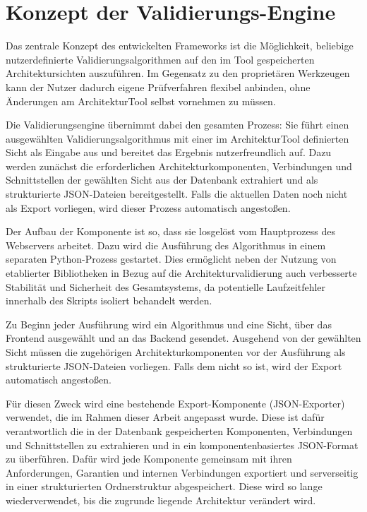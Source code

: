 \section{Konzept der Validierungs-Engine}
\label{sect:K_engine}
Das zentrale Konzept des entwickelten Frameworks ist die Möglichkeit, beliebige nutzerdefinierte Validierungsalgorithmen auf den im Tool gespeicherten Architektursichten auszuführen. Im Gegensatz zu den proprietären Werkzeugen kann der Nutzer dadurch eigene Prüfverfahren flexibel anbinden, ohne Änderungen am ArchitekturTool selbst vornehmen zu müssen.

Die Validierungsengine übernimmt dabei den gesamten Prozess: Sie führt einen ausgewählten Validierungsalgorithmus mit einer im ArchitekturTool definierten Sicht als Eingabe aus und bereitet das Ergebnis nutzerfreundlich auf. Dazu werden zunächst die erforderlichen Architekturkomponenten, Verbindungen und Schnittstellen der gewählten Sicht aus der Datenbank extrahiert und als strukturierte JSON-Dateien bereitgestellt. Falls die aktuellen Daten noch nicht als Export vorliegen, wird dieser Prozess automatisch angestoßen.

Der Aufbau der Komponente ist so, dass sie losgelöst vom Hauptprozess des Webservers arbeitet. Dazu wird die Ausführung des Algorithmus in einem separaten Python-Prozess gestartet. Dies ermöglicht neben der Nutzung von etablierter Bibliotheken in Bezug auf die Architekturvalidierung auch verbesserte Stabilität und Sicherheit des Gesamtsystems, da potentielle Laufzeitfehler innerhalb des Skripts isoliert behandelt werden.

Zu Beginn jeder Ausführung wird ein Algorithmus und eine Sicht, über das Frontend ausgewählt und an das Backend gesendet. Ausgehend von der gewählten Sicht müssen die zugehörigen Architekturkomponenten vor der Ausführung als strukturierte JSON-Dateien vorliegen. Falls dem nicht so ist, wird der Export automatisch angestoßen.

Für diesen Zweck wird eine bestehende Export-Komponente (JSON-Exporter) verwendet, die im Rahmen dieser Arbeit angepasst wurde. Diese ist dafür verantwortlich die in der Datenbank gespeicherten Komponenten, Verbindungen und Schnittstellen zu extrahieren und in ein komponentenbasiertes JSON-Format zu überführen. Dafür wird jede Komponente gemeinsam mit ihren Anforderungen, Garantien und internen Verbindungen exportiert und serverseitig in einer strukturierten Ordnerstruktur abgespeichert. Diese wird so lange wiederverwendet, bis die zugrunde liegende Architektur verändert wird.

